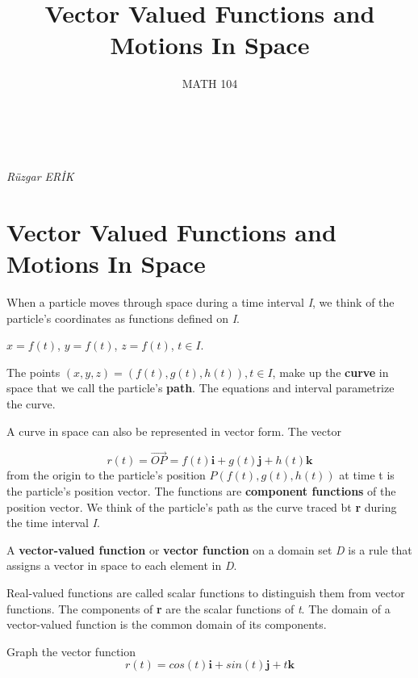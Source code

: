 \documentclass[12pt,a4paper]{article}
\makeatletter
\renewcommand{\maketitle}{%
  \thispagestyle{firstpage} %
  \begin{tcolorbox}[colback=white,colframe=black,width=\textwidth,arc=0mm,auto outer arc]
    \begin{center}
      \Large \@title \\[1ex] \large \@date \\ \textit{Rüzgar ERİK}
    \end{center}
  \end{tcolorbox}
}
\makeatother
\begin{document}
\title{Vector Valued Functions and Motions In Space}
\date{MATH 104}
\maketitle
\tableofcontents %

\newpage %




\section{Vector Valued Functions and Motions In Space}

When a particle moves through space during a time interval \textit{I}, we think of the particle's coordinates as functions defined on \textit{I}.


\begin{center}
    \(x = f(t)\), \(y = f(t)\), \(z = f(t)\), \(t \in \mathit{I}.\)
\end{center}


\noindent The points \(\left(x, y, z\right) = \left(f(t), g(t), h(t)\right), t \in \mathit{I} \), make up the \textbf{curve} in space that we call the particle's \textbf{path}. The equations and interval parametrize the curve.

A curve in space can also be represented in vector form. The vector

    \[r(t) = \vec{OP} = f(t)\mathbf{i} + g(t)\mathbf{j} + h(t)\mathbf{k}\]
from the origin to the particle's position \(P(f(t),g(t),h(t))\) at time t is the particle's position vector. 
The functions are \textbf{component functions} of the position vector. We think of the particle's path as the curve traced bt \textbf{r} during the time interval \textit{I}.

A \textbf{vector-valued function} or \textbf{vector function} on a domain set \textit{D} is a rule that assigns a vector in space to each element in \textit{D}.

Real-valued functions are called scalar functions to distinguish them from vector
functions. The components of \textbf{r} are the scalar functions of \textit{t}. The domain of a vector-valued function is the common domain of its components.



\newpage

\begin{example}
Graph the vector function
\[r(t) = cos(t)\mathbf{i} + sin(t)\mathbf{j} + t\mathbf{k}\]
\end{example}
\end{document}

